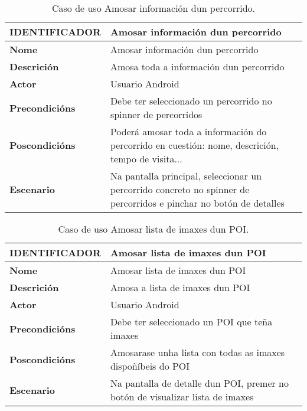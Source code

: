 \begin{table}[tbh]
	\footnotesize
	\centering
	\begin{tabular}{|l|p{10cm}|}
		\hline 
		\textbf{IDENTIFICADOR}	& \textbf{Amosar información dun percorrido} \\ 
		\hline 
		\textbf{Nome} & Amosar información dun percorrido \\ 
		\hline 
		\textbf{Descrición} & Amosa toda a información dun percorrido \\ 
		\hline 
		\textbf{Actor} & Usuario Android \\ 
		\hline 
		\textbf{Precondicións} & Debe ter seleccionado un percorrido no spinner de percorridos \\ 
		\hline 
		\textbf{Poscondicións} & Poderá amosar toda a información do percorrido en cuestión: nome, descrición, tempo de visita... \\ 
		\hline 
		\textbf{Escenario} & Na pantalla principal, seleccionar un percorrido concreto no spinner de percorridos e pinchar no botón de detalles \\ 
		\hline 
	\end{tabular}
	\caption{Caso de uso Amosar información dun percorrido.}
	\label{tab:cuAmosarPercorrido}
\end{table}

\begin{table}[tbh]
	\footnotesize
	\centering
	\begin{tabular}{|l|p{10cm}|}
		\hline 
		\textbf{IDENTIFICADOR}	& \textbf{Amosar lista de imaxes dun POI} \\ 
		\hline 
		\textbf{Nome} & Amosar lista de imaxes dun POI \\ 
		\hline 
		\textbf{Descrición} & Amosa a lista de imaxes dun POI \\ 
		\hline 
		\textbf{Actor} & Usuario Android \\ 
		\hline 
		\textbf{Precondicións} & Debe ter seleccionado un POI que teña imaxes \\ 
		\hline 
		\textbf{Poscondicións} & Amosarase unha lista con todas as imaxes dispoñíbeis do POI \\ 
		\hline 
		\textbf{Escenario} & Na pantalla de detalle dun POI, premer no botón de visualizar lista de imaxes \\ 
		\hline 
	\end{tabular}
	\caption{Caso de uso Amosar lista de imaxes dun POI.}
	\label{tab:cuAmosarListaImaxePOI}
\end{table}

